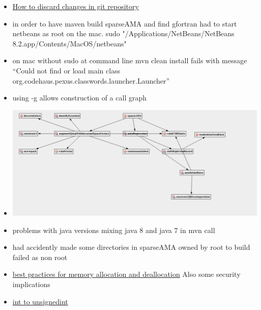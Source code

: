 \documentclass[hyperref]{labbook}
\begin{document}
\begin{itemize}
\item \href{http://stackoverflow.com/questions/1146973/how-do-i-revert-all-local-changes-in-git-managed-project-to-previous-state}{How to discard changes in git repository}
\item in order to have maven build sparseAMA and find gfortran had to start netbeans as root on the mac.  sudo "/Applications/NetBeans/NetBeans 8.2.app/Contents/MacOS/netbeans"
\item on mac without sudo at command line mvn clean install fails with message ``Could not find or load main class org.codehaus.pexus.classwords.launcher.Launcher''
\item using -g allows construction of a call graph
\end{itemize}
\begin{itemize}
\item \includegraphics{sparseAMA.png}
\item problems with java versions mixing java 8 and java 7 in mvn call
\item had accidently made some directories in sparseAMA owned by root to build failed as non root
\item \href{https://www.codeproject.com/Articles/13853/Secure-Coding-Best-Practices-for-Memory-Allocation}{best practices for memory allocation and deallocation} Also some security implications
\item \href{http://stackoverflow.com/questions/5169692/assigning-negative-numbers-to-an-unsigned-int}{int to unsignedint}
\end{itemize}

\end{document}
